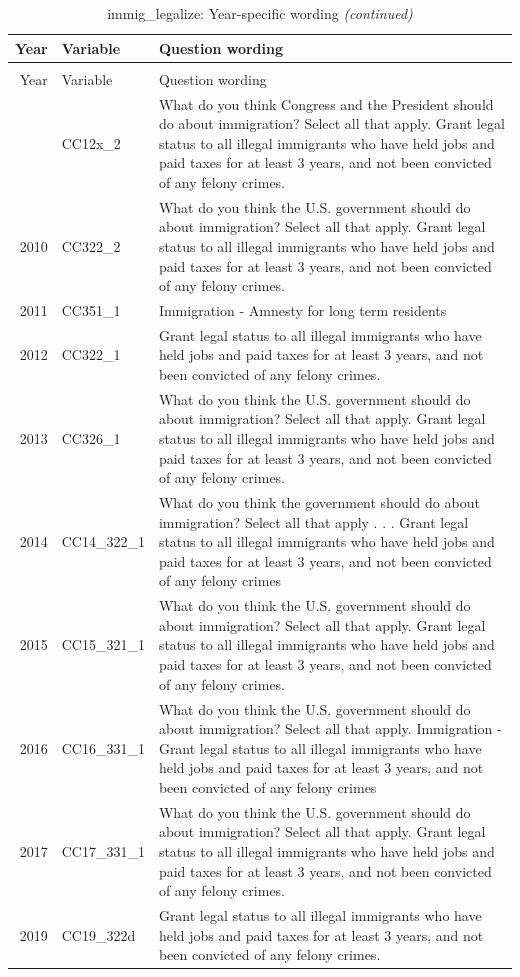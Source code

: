 \documentclass[12pt]{article}
\begin{document}
\begin{longtable}[t]{rl>{\raggedright\arraybackslash}p{10cm}}
\caption{\label{tab:unnamed-chunk-4}immig\_legalize: Year-specific wording}\\
\toprule
Year & Variable & Question wording\\
\midrule
\endfirsthead
\caption[]{immig\_legalize: Year-specific wording \textit{(continued)}}\\
\toprule
Year & Variable & Question wording\\
\midrule
\endhead
\
\endfoot
\bottomrule
\endlastfoot
2007 & CC12x\_2 & What do you think Congress and the President should do about immigration? Select all that apply. Grant legal status to all illegal immigrants who have held jobs and paid taxes for at least 3 years, and not been convicted of any felony crimes.\\
2010 & CC322\_2 & What do you think the U.S. government should do about immigration? Select all that apply. Grant legal status to all illegal immigrants who have held jobs and paid taxes for at least 3 years, and not been convicted of any felony crimes.\\
2011 & CC351\_1 & Immigration - Amnesty for long term residents\\
2012 & CC322\_1 & Grant legal status to all illegal immigrants who have held jobs and paid taxes for at least 3 years, and not been convicted of any felony crimes.\\
2013 & CC326\_1 & What do you think the U.S. government should do about immigration? Select all that apply. Grant legal status to all illegal immigrants who have held jobs and paid taxes for at least 3 years, and not been convicted of any felony crimes.\\
2014 & CC14\_322\_1 & What do you think the government should do about immigration? Select all that apply . . . Grant legal status to all illegal immigrants who have held jobs and paid taxes for at least 3 years, and not been convicted of any felony crimes\\
2015 & CC15\_321\_1 & What do you think the U.S. government should do about immigration? Select all that apply. Grant legal status to all illegal immigrants who have held jobs and paid taxes for at least 3 years, and not been convicted of any felony crimes.\\
2016 & CC16\_331\_1 & What do you think the U.S. government should do about immigration? Select all that apply. Immigration - Grant legal status to all illegal immigrants who have held jobs and paid taxes for at least 3 years, and not been convicted of any felony crimes\\
2017 & CC17\_331\_1 & What do you think the U.S. government should do about immigration? Select all that apply. Grant legal status to all illegal immigrants who have held jobs and paid taxes for at least 3 years, and not been convicted of any felony crimes.\\
2019 & CC19\_322d & Grant legal status to all illegal immigrants who have held jobs and paid taxes for at least 3 years, and not been convicted of any felony crimes.\\*
\end{longtable}
\end{document}
